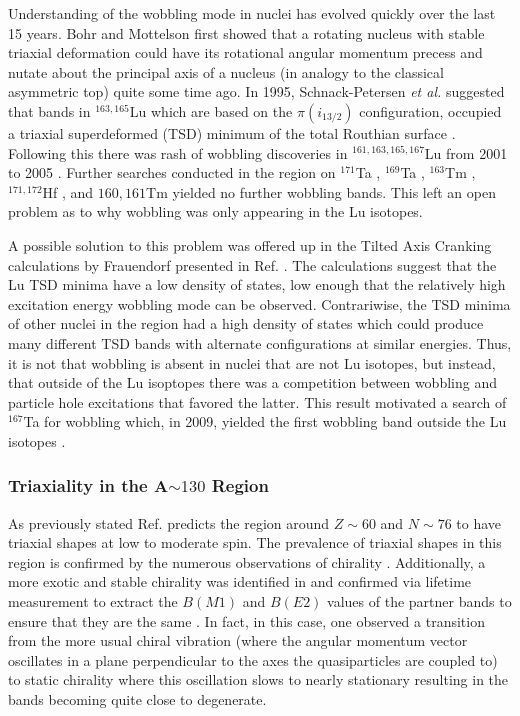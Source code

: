 Understanding of the wobbling mode in nuclei has evolved quickly over the last 15 years. Bohr and Mottelson first showed that a rotating nucleus with stable triaxial deformation could have its rotational angular momentum precess and nutate about the principal axis of a nucleus \cite{bohrMottelson2} (in analogy to the classical asymmetric top) quite some time ago. In 1995, Schnack-Petersen \emph{et al.} suggested that bands in $^{163,165}$Lu which are based on the $\pi{}(i_{13/2})$ configuration, occupied a triaxial superdeformed (TSD) minimum of the total Routhian surface \cite{tsdLutetium}. Following this there was rash of wobbling discoveries in $^{161,163,165,167}$Lu from 2001 to 2005 \cite{wobblingIn163Lu,wobblingIn163LuTwoPhonon,wobblingIn165Lu,wobblingIn167Lu,wobblingIn161Lu}. Further searches conducted in the region on $^{171}$Ta \cite{wobbSearch171Ta}, $^{169}$Ta \cite{wobbSearch169Ta}, $^{163}$Tm \cite{wobbSearch163Tm}, $^{171,172}$Hf \cite{wobbSearch1712Hf}, and ${160,161}$Tm \cite{wobbSearch1601Tm} yielded no further wobbling bands. This left an open problem as to why wobbling was only appearing in the Lu isotopes.

A possible solution to this problem was offered up in the Tilted Axis Cranking calculations by Frauendorf presented in Ref. \cite{wobbSearch163Tm}. The calculations suggest that the Lu TSD minima have a low density of states, low enough that the relatively high excitation energy wobbling mode can be observed. Contrariwise, the TSD minima of other nuclei in the region had a high density of states which could produce many different TSD bands with alternate configurations at similar energies. Thus, it is not that wobbling is absent in nuclei that are not Lu isotopes, but instead, that outside of the Lu isoptopes there was a competition between wobbling and particle hole excitations that favored the latter. This result motivated a search of $^{167}$Ta for wobbling which, in 2009, yielded the first wobbling band outside the Lu isotopes \cite{wobblingIn167Ta}.

\subsubsection{Triaxiality in the A$\sim{}130$ Region}
\label{sec:trw-triax}
As previously stated Ref. \cite{groundStateTriax} predicts the region around $Z\sim{}60$ and $N\sim{}76$ to have triaxial shapes at low to moderate spin. The prevalence of triaxial shapes in this region is confirmed by the numerous observations of chirality \cite{chiralityIn134Pr,chiralityA130Region,chiralityUpperA130Region,chiralityA130Region2,chirality136Pm,chiralityMore135Nd,chiralityIn135Nd,chiralityMulti133Cs}. Additionally, a more exotic and stable chirality was identified in \cite{chiralityMore135Nd,chiralityIn135Nd} and confirmed via lifetime measurement to extract the $B(M1)$ and $B(E2)$ values of the partner bands to ensure that they are the same \cite{chiralityIn135Nd}. In fact, in this case, one observed a transition from the more usual chiral vibration (where the angular momentum vector oscillates in a plane perpendicular to the axes the quasiparticles are coupled to) to static chirality where this oscillation slows to nearly stationary resulting in the bands becoming quite close to degenerate.

